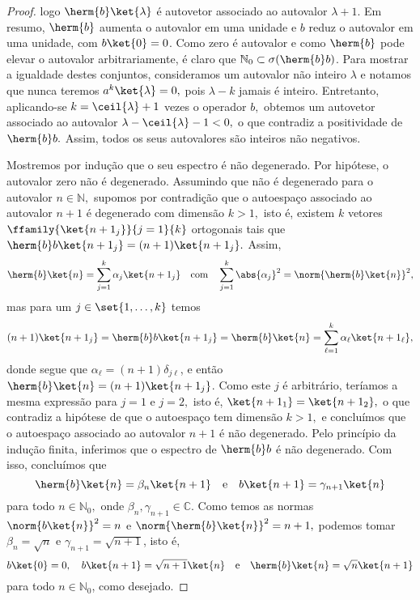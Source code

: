 \begin{proof}
    logo \(\herm{b}\ket{\lambda}\) é autovetor associado ao autovalor \(\lambda + 1.\) Em resumo, \(\herm{b}\) aumenta o autovalor em uma unidade e \(b\) reduz o autovalor em uma unidade, com \(b\ket{0} = 0\). Como zero é autovalor e como \(\herm{b}\) pode elevar o autovalor arbitrariamente, é claro que \(\mathbb{N}_0 \subset \sigma(\herm{b}b)\). Para mostrar a igualdade destes conjuntos, consideramos um autovalor não inteiro \(\lambda\) e notamos que nunca teremos \(a^k \ket{\lambda} = 0,\) pois \(\lambda - k\) jamais é inteiro. Entretanto, aplicando-se \(k = \ceil{\lambda} + 1\) vezes o operador \(b,\) obtemos um autovetor associado ao autovalor \(\lambda - \ceil{\lambda} - 1 < 0,\) o que contradiz a positividade de \(\herm{b}b.\) Assim, todos os seus autovalores são inteiros não negativos.

    Mostremos por indução que o seu espectro é não degenerado. Por hipótese, o autovalor zero não é degenerado. Assumindo que não é degenerado para o autovalor \(n \in \mathbb{N},\) supomos por contradição que o autoespaço associado ao autovalor \(n + 1\) é degenerado com dimensão \(k > 1,\) isto é, existem \(k\) vetores \(\ffamily{\ket{n + 1_j}}{j = 1}{k}\) ortogonais tais que \(\herm{b}b\ket{n+1_j} = (n+1)\ket{n+1_j}.\) Assim, 
    \begin{equation*}
        \herm{b}\ket{n} = \sum_{j = 1}^k \alpha_j \ket{n + 1_j}
        \quad\text{com}\quad
        \sum_{j = 1}^k \abs{\alpha_j}^2 = \norm{\herm{b}\ket{n}}^2,
    \end{equation*}
    mas para um \(j \in \set{1, \dots, k}\) temos
    \begin{equation*}
        (n + 1) \ket{n+1_j} = \herm{b}b\ket{n+1_j} = \herm{b}\ket{n} = \sum_{\ell = 1}^k \alpha_{\ell} \ket{n+1_\ell},
    \end{equation*}
    donde segue que \(\alpha_{\ell} = (n+1) \delta_{j \ell}\), e então \(\herm{b}\ket{n} = (n+1) \ket{n + 1_j}\). Como este \(j\) é arbitrário, teríamos a mesma expressão para \(j = 1\) e \(j = 2,\) isto é, \(\ket{n+1_1} = \ket{n+1_2},\) o que contradiz a hipótese de que o autoespaço tem dimensão \(k > 1,\) e concluímos que o autoespaço associado ao autovalor \(n + 1\) é não degenerado. Pelo princípio da indução finita, inferimos que o espectro de \(\herm{b}b\) é não degenerado. Com isso, concluímos que
    \begin{equation*}
        \herm{b} \ket{n} = \beta_n\ket{n+1}
        \quad\text{e}\quad
        b \ket{n+1} = \gamma_{n+1} \ket{n}
    \end{equation*}
    para todo \(n \in \mathbb{N}_0,\) onde \(\beta_n, \gamma_{n+1} \in \mathbb{C}.\) Como temos as normas \(\norm{b \ket{n}}^2 = n\) e \(\norm{\herm{b}\ket{n}}^2 = n+1,\) podemos tomar \(\beta_n = \sqrt{n}\) e \(\gamma_{n+1} = \sqrt{n+1}\), isto é, 
    \begin{equation*}
        b\ket{0} = 0,\quad
        b\ket{n+1} = \sqrt{n+1} \ket{n}
        \quad\text{e}\quad
        \herm{b} \ket{n} = \sqrt{n} \ket{n+1}
    \end{equation*}
    para todo \(n \in \mathbb{N}_0\), como desejado.
\end{proof}
